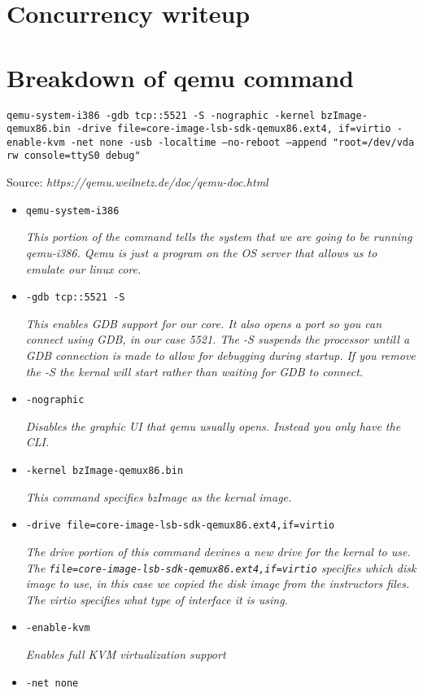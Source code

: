 \documentclass[letterpaper,10pt,titlepage]{article}
\begin{document}
\section*{Concurrency writeup}



\section*{Breakdown of qemu command}
\texttt{qemu-system-i386 -gdb tcp::5521 -S -nographic -kernel
bzImage-qemux86.bin -drive file=core-image-lsb-sdk-qemux86.ext4,
if=virtio -enable-kvm -net none -usb -localtime --no-reboot
--append "root=/dev/vda rw console=ttyS0 debug"}

Source:
\textsl{https://qemu.weilnetz.de/doc/qemu-doc.html}

\begin{itemize}
\item{\texttt{qemu-system-i386}}

\textsl{This portion of the command tells the system that we are going to be 
running qemu-i386. Qemu is just a program on the OS server that allows us to 
emulate our linux core. }
\item{\texttt{-gdb tcp::5521 -S}}

\textsl{This enables GDB support for our core. It also opens a port so you can 
connect using GDB, in our case 5521. The -S suspends the processor untill a GDB 
connection is made to allow for debugging during startup. If you remove the -S 
the kernal will start rather than waiting for GDB to connect.}
\item{\texttt{-nographic}}

\textsl{Disables the graphic UI that qemu usually opens. Instead you only have 
the CLI.}
\item{\texttt{-kernel bzImage-qemux86.bin}}

\textsl{This command specifies  bzImage as the kernal image.}
\item{\texttt{-drive file=core-image-lsb-sdk-qemux86.ext4,if=virtio}}

\textsl{The drive portion of this command devines a new drive for the kernal to 
use. The \texttt{file=core-image-lsb-sdk-qemux86.ext4,if=virtio} specifies which 
disk image to use, in this case we copied the disk image from the instructors 
files. The virtio specifies what type of interface it is using.}
\item{\texttt{-enable-kvm}}

\textsl{Enables full KVM virtualization support}
\item{\texttt{-net none}}


\end{itemize}
\end{document}
